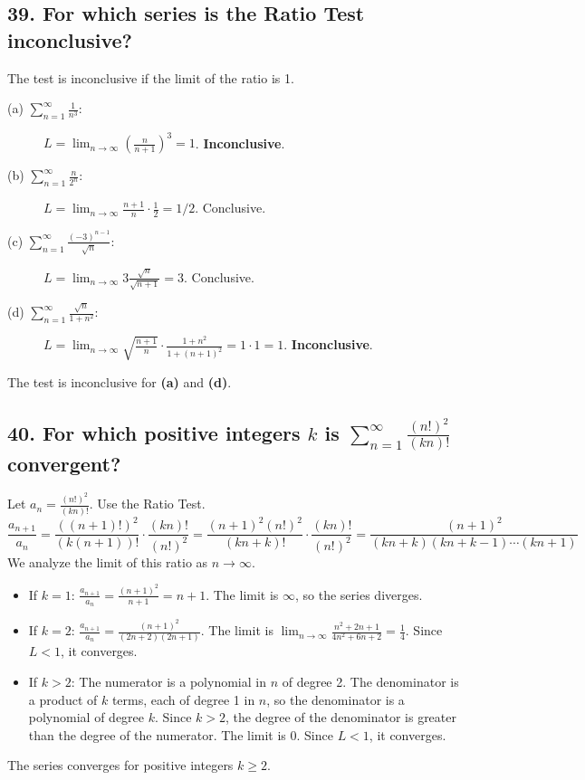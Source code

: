 \documentclass{article}
\begin{document}
\subsection*{39. For which series is the Ratio Test inconclusive?}
The test is inconclusive if the limit of the ratio is 1.
\begin{description}
    \item[(a) $\sum_{n=1}^\infty \frac{1}{n^3}$:] $L = \lim_{n \to \infty} \left(\frac{n}{n+1}\right)^3 = 1$. \textbf{Inconclusive}.
    \item[(b) $\sum_{n=1}^\infty \frac{n}{2^n}$:] $L = \lim_{n \to \infty} \frac{n+1}{n} \cdot \frac{1}{2} = 1/2$. Conclusive.
    \item[(c) $\sum_{n=1}^\infty \frac{(-3)^{n-1}}{\sqrt{n}}$:] $L = \lim_{n \to \infty} 3 \frac{\sqrt{n}}{\sqrt{n+1}} = 3$. Conclusive.
    \item[(d) $\sum_{n=1}^\infty \frac{\sqrt{n}}{1+n^2}$:] $L = \lim_{n \to \infty} \sqrt{\frac{n+1}{n}} \cdot \frac{1+n^2}{1+(n+1)^2} = 1 \cdot 1 = 1$. \textbf{Inconclusive}.
\end{description}
The test is inconclusive for \textbf{(a)} and \textbf{(d)}.

\subsection*{40. For which positive integers $k$ is $\sum_{n=1}^\infty \frac{(n!)^2}{(kn)!}$ convergent?}
Let $a_n = \frac{(n!)^2}{(kn)!}$. Use the Ratio Test.
\[ \frac{a_{n+1}}{a_n} = \frac{((n+1)!)^2}{(k(n+1))!} \cdot \frac{(kn)!}{(n!)^2} = \frac{(n+1)^2 (n!)^2}{(kn+k)!} \cdot \frac{(kn)!}{(n!)^2} = \frac{(n+1)^2}{(kn+k)(kn+k-1)\cdots(kn+1)} \]
We analyze the limit of this ratio as $n \to \infty$.
\begin{itemize}
    \item If $k=1$: $\frac{a_{n+1}}{a_n} = \frac{(n+1)^2}{n+1} = n+1$. The limit is $\infty$, so the series diverges.
    \item If $k=2$: $\frac{a_{n+1}}{a_n} = \frac{(n+1)^2}{(2n+2)(2n+1)}$. The limit is $\lim_{n \to \infty} \frac{n^2+2n+1}{4n^2+6n+2} = \frac{1}{4}$. Since $L<1$, it converges.
    \item If $k > 2$: The numerator is a polynomial in $n$ of degree 2. The denominator is a product of $k$ terms, each of degree 1 in $n$, so the denominator is a polynomial of degree $k$. Since $k>2$, the degree of the denominator is greater than the degree of the numerator. The limit is 0. Since $L<1$, it converges.
\end{itemize}
The series converges for positive integers $k \ge 2$.
\end{document}
